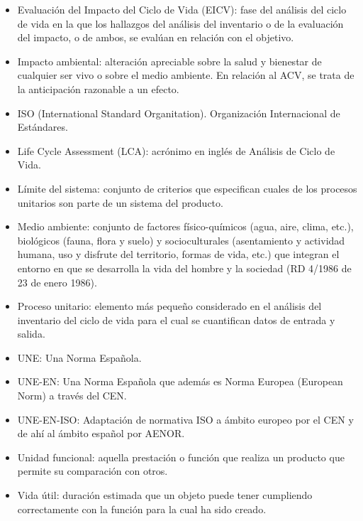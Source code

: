 \begin{itemize}
  \item Evaluación del Impacto del Ciclo de Vida (EICV): fase del análisis del ciclo de vida en la que los hallazgos del análisis del inventario o de la evaluación del impacto, o de ambos, se evalúan en relación con el objetivo.
  \item Impacto ambiental: alteración apreciable sobre la salud y bienestar de cualquier ser vivo o sobre el medio ambiente. En relación al ACV, se trata de la anticipación razonable a un efecto.
  \item ISO (International Standard Organitation). Organización Internacional de Estándares.
  \item Life Cycle Assessment (LCA): acrónimo en inglés de Análisis de Ciclo de Vida.
  \item Límite del sistema: conjunto de criterios que especifican cuales de los procesos unitarios son parte de un sistema del producto.
  \item Medio ambiente: conjunto de factores físico-químicos (agua, aire, clima, etc.), biológicos (fauna, flora y suelo) y socioculturales (asentamiento y actividad humana, uso y disfrute del territorio, formas de vida, etc.) que integran el entorno en que se desarrolla la vida del hombre y la sociedad (RD 4/1986 de 23 de enero 1986).
  \item Proceso unitario: elemento más pequeño considerado en el análisis del inventario del ciclo de vida para el cual se cuantifican datos de entrada y salida.
  \item UNE: Una Norma Española.
  \item UNE-EN: Una Norma Española que además es Norma Europea (European Norm) a través del CEN.
  \item UNE-EN-ISO: Adaptación de normativa ISO a ámbito europeo por el CEN y de ahí al ámbito español por AENOR.
  \item Unidad funcional: aquella prestación o función que realiza un producto que permite su comparación con otros.
  \item Vida útil: duración estimada que un objeto puede tener cumpliendo correctamente con la función para la cual ha sido creado.
\end{itemize}
